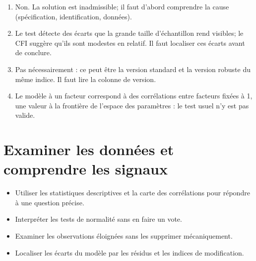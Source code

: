 \documentclass[
  french,
  11pt,
  a4paper,
  DIV=11,
  numbers=noendperiod]{scrreprt}
\providecommand{\tightlist}{%
  \setlength{\itemsep}{0pt}\setlength{\parskip}{0pt}}
\begin{document}
\begin{tcolorbox}[enhanced jigsaw, arc=.35mm, bottomrule=.15mm, bottomtitle=1mm, breakable, colback=white, colbacktitle=quarto-callout-tip-color!10!white, colframe=quarto-callout-tip-color-frame, coltitle=black, left=2mm, leftrule=.75mm, opacityback=0, opacitybacktitle=0.6, rightrule=.15mm, title={Réponses}, titlerule=0mm, toprule=.15mm, toptitle=1mm]

\begin{enumerate}
\def\labelenumi{\arabic{enumi}.}
\tightlist
\item
  Non. La solution est inadmissible; il faut d'abord comprendre la cause
  (spécification, identification, données).
\item
  Le test détecte des écarts que la grande taille d'échantillon rend
  visibles; le CFI suggère qu'ils sont modestes en relatif. Il faut
  localiser ces écarts avant de conclure.
\item
  Pas nécessairement : ce peut être la version standard et la version
  robuste du même indice. Il faut lire la colonne de version.
\item
  Le modèle à un facteur correspond à des corrélations entre facteurs
  fixées à 1, une valeur à la frontière de l'espace des paramètres : le
  test usuel n'y est pas valide.
\end{enumerate}

\end{tcolorbox}


\chapter{Examiner les données et comprendre les
signaux}\label{sec-diagnostics}

\begin{tcolorbox}[enhanced jigsaw, arc=.35mm, bottomrule=.15mm, bottomtitle=1mm, breakable, colback=white, colbacktitle=quarto-callout-note-color!10!white, colframe=quarto-callout-note-color-frame, coltitle=black, left=2mm, leftrule=.75mm, opacityback=0, opacitybacktitle=0.6, rightrule=.15mm, title={Objectifs du chapitre}, titlerule=0mm, toprule=.15mm, toptitle=1mm]

\begin{itemize}
\tightlist
\item
  Utiliser les statistiques descriptives et la carte des corrélations
  pour répondre à une question précise.
\item
  Interpréter les tests de normalité sans en faire un vote.
\item
  Examiner les observations éloignées sans les supprimer mécaniquement.
\item
  Localiser les écarts du modèle par les résidus et les indices de
  modification.
\end{itemize}

\end{tcolorbox}
\end{document}
